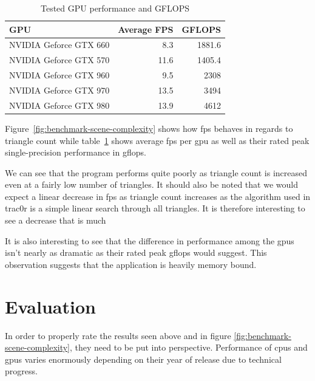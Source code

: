 \documentclass[
  twoside,
  11pt, a4paper,
  footinclude=true,
  headinclude=true,
  cleardoublepage=empty
]{scrreprt}
\begin{document}
\begin{minipage}{\textwidth}
    \begin{table}[H]
        \centering
        \begin{tabular}{l | r | r}
            GPU                     & Average FPS   & GFLOPS \\ \hline
            NVIDIA Geforce GTX 660  & 8.3           & 1881.6 \\
            NVIDIA Geforce GTX 570  & 11.6          & 1405.4 \\
            NVIDIA Geforce GTX 960  & 9.5           & 2308   \\
            NVIDIA Geforce GTX 970  & 13.5          & 3494   \\
            NVIDIA Geforce GTX 980  & 13.9          & 4612
        \end{tabular}
        \caption{Tested GPU performance and GFLOPS}
        \label{tbl:benchmark-table}
    \end{table}
\end{minipage}

Figure~\ref{fig:benchmark-scene-complexity} shows how \ac{fps} behaves in regards to triangle
count while table~\ref{tbl:benchmark-table} shows average \ac{fps} per \ac{gpu} as well as their
rated peak single-precision performance in \ac{gflops}.

We can see that the program performs quite poorly as triangle count is increased even at a
fairly low number of triangles. It should also be noted that we would expect a linear decrease in
\ac{fps} as triangle count increases as the algorithm used in trac0r is a simple linear search
through all triangles. It is therefore interesting to see a decrease that is much %

It is also interesting to see that the difference in performance among the \acp{gpu} isn't nearly
as dramatic as their rated peak \ac{gflops} would suggest. This observation suggests that the
application is heavily memory bound.

\section{Evaluation}
In order to properly rate the results seen above and in figure \ref{fig:benchmark-scene-complexity},
they need to be put into perspective. Performance
of \acp{cpu} and \acp{gpu} varies enormously depending on their year of release due to technical
progress.
\end{document}

